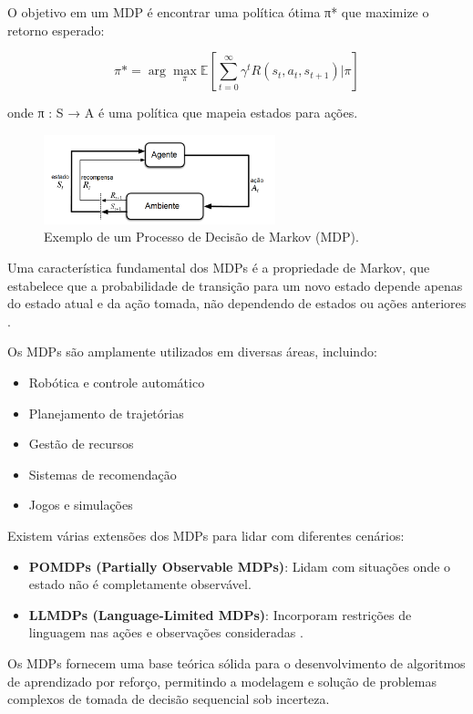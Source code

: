 O objetivo em um MDP é encontrar uma política ótima π* que maximize o retorno esperado:

$$ π* = \arg\max_π \mathbb{E}\left[\sum_{t=0}^{\infty} γ^t R(s_t, a_t, s_{t+1}) | π\right] $$

onde π : S → A é uma política que mapeia estados para ações.

\begin{figure}[H]
 \centering
 \includegraphics[width=0.60\textwidth]{fig/MDP.png}
 \caption{Exemplo de um Processo de Decisão de Markov (MDP).}
 \label{fig:mdp_ilustracao}
\end{figure}

Uma característica fundamental dos MDPs é a propriedade de Markov, que estabelece que a probabilidade de transição para um novo estado depende apenas do estado atual e da ação tomada, não dependendo de estados ou ações anteriores \cite{sutton}.

Os MDPs são amplamente utilizados em diversas áreas, incluindo:

\begin{itemize}
\item Robótica e controle automático
\item Planejamento de trajetórias
\item Gestão de recursos
\item Sistemas de recomendação
\item Jogos e simulações
\end{itemize}

Existem várias extensões dos MDPs para lidar com diferentes cenários:

\begin{itemize}
\item \textbf{POMDPs (Partially Observable MDPs)}: Lidam com situações onde o estado não é completamente observável.
\item \textbf{LLMDPs (Language-Limited MDPs)}: Incorporam restrições de linguagem nas ações e observações consideradas \cite{introducao_modelos_probabilisticos}.
\end{itemize}

Os MDPs fornecem uma base teórica sólida para o desenvolvimento de algoritmos de aprendizado por reforço, permitindo a modelagem e solução de problemas complexos de tomada de decisão sequencial sob incerteza.

